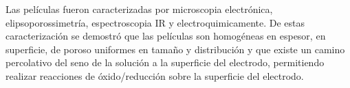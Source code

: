 Las películas fueron caracterizadas por microscopia electrónica, elipsoporossimetría, espectroscopia IR y electroquimicamente. De estas caracterización se demostró que las películas son homogéneas en espesor, en superficie, de poroso uniformes en tamaño y distribución y que existe un camino percolativo del seno de la solución a la superficie del electrodo, permitiendo realizar reacciones de óxido/reducción sobre la superficie del electrodo.





